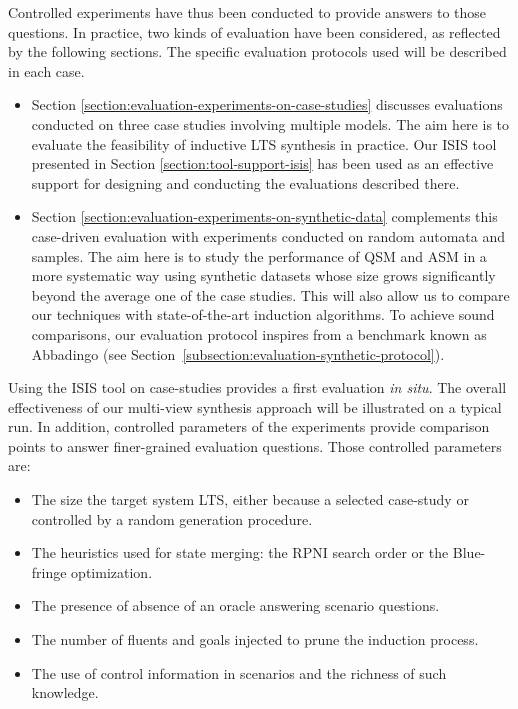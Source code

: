 Controlled experiments have thus been conducted to provide answers to those questions. In practice, two kinds of evaluation have been considered, as reflected by the following sections. The specific evaluation protocols used will be described in each case.
\begin{itemize}

\item Section \ref{section:evaluation-experiments-on-case-studies} discusses evaluations conducted on three case studies involving multiple models. The aim here is to evaluate the feasibility of inductive LTS synthesis in practice. Our ISIS tool presented in Section \ref{section:tool-support-isis} has been used as an effective support for designing and conducting the evaluations described there.

\item Section \ref{section:evaluation-experiments-on-synthetic-data} complements this case-driven evaluation with experiments conducted on random automata and samples. The aim here is to study the performance of QSM and ASM in a more systematic way using synthetic datasets whose size grows significantly beyond the average one of the case studies. This will also allow us to compare our techniques with state-of-the-art induction algorithms. To achieve sound comparisons, our evaluation protocol inspires from a benchmark known as Abbadingo \cite{Lang:1998} (see Section~\ref{subsection:evaluation-synthetic-protocol}).
\end{itemize}

Using the ISIS tool on case-studies provides a first evaluation \emph{in situ}. The overall effectiveness of our multi-view synthesis approach will be illustrated on a typical run. In addition, controlled parameters of the experiments provide comparison points to answer finer-grained evaluation questions. Those controlled parameters are:
\begin{itemize}
\item The size the target system LTS, either because a selected case-study or controlled by a random generation procedure.
\item The heuristics used for state merging: the RPNI search order or the Blue-fringe optimization.
\item The presence of absence of an oracle answering scenario questions.
\item The number of fluents and goals injected to prune the induction process.
\item The use of control information in scenarios and the richness of such knowledge.
\end{itemize}

